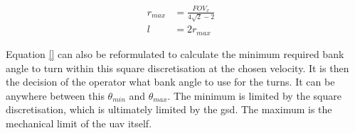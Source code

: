 \begin{equation}
	\label{eqn:}
	\begin{aligned}
		r_{max} &= \frac{FOV_x}{4\sqrt{2}-2} &\\
		l &= 2r_{max}
	\end{aligned}
\end{equation}

Equation \ref{} can also be reformulated to calculate the minimum required bank angle to turn within this square discretisation at the chosen velocity. It is then the decision of the operator what bank angle to use for the turns. It can be anywhere between this $\theta_{min}$ and $\theta_{max}$. The minimum is limited by the square discretisation, which is ultimately limited by the \ac{gsd}. The maximum is the mechanical limit of the \ac{uav} itself.
